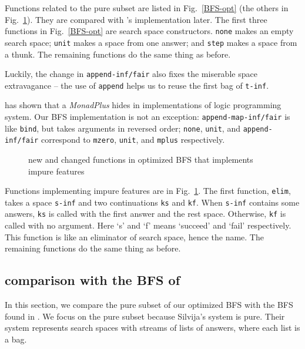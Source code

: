 \documentclass[format=acmlarge, review=true, authordraft=true]{acmart}
\begin{document}
Functions related to the pure subset are listed in Fig.~\ref{BFS-opt} (the 
others in Fig.~\ref{BFS-opt-cont}). They are compared with 
\citeauthor{seres1999algebra}'s implementation later. The first three functions 
in Fig.~\ref{BFS-opt} are search space constructors. \texttt{none} makes an 
empty search space; \texttt{unit} makes a space from one answer; and 
\texttt{step} makes a space from a thunk. The remaining functions do the same 
thing as before. 

Luckily, the change in \texttt{append-inf/fair} also fixes the miserable space 
extravagance -- the use of \texttt{append} helps us to reuse the first bag of 
\texttt{t-inf}.

\citet{kiselyov2005backtracking} has shown that a \emph{MonadPlus} hides in 
implementations of logic programming system. Our BFS implementation is not an 
exception: \texttt{append-map-inf/fair} is like \texttt{bind}, 
but takes arguments in reversed order; \texttt{none}, \texttt{unit}, and 
\texttt{append-inf/fair} correspond to \texttt{mzero}, \texttt{unit}, 
and \texttt{mplus} respectively.

\begin{figure}
		
	\caption{new and changed functions in optimized BFS that implements impure 
		features}
	\label{BFS-opt-cont}
\end{figure}

Functions implementing impure features are in Fig.~\ref{BFS-opt-cont}. The 
first function, \texttt{elim}, takes a space \texttt{s-inf} and two 
continuations \texttt{ks} and \texttt{kf}. When \texttt{s-inf} contains some 
answers, \texttt{ks} is called with the first answer and the rest space. 
Otherwise, \texttt{kf} is called with no argument. Here `s' and `f' means 
`succeed' and `fail' respectively. This function is like an eliminator of 
search space, hence the name. The remaining functions do the same thing as 
before.

\subsection{comparison with the BFS of \citet{seres1999algebra}}

In this section, we compare the pure subset of our optimized BFS with the BFS 
found in \citet{seres1999algebra}. We focus on the pure subset because 
Silvija's system is pure. Their system represents search spaces with streams of 
lists of answers, where each list is a bag.
\end{document}
